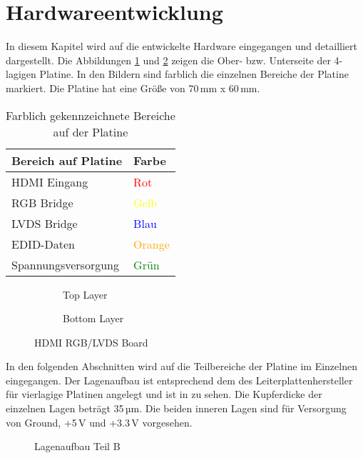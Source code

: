 \section{Hardwareentwicklung}
\label{sec:TeilB_Hardware}
In diesem Kapitel wird auf die entwickelte Hardware eingegangen und detailliert dargestellt. Die Abbildungen \ref{fig:teilb_pcb_top} und \ref{fig:teilb_pcb_bot} zeigen die Ober- bzw. Unterseite der 4-lagigen Platine. In den Bildern sind farblich die einzelnen Bereiche der Platine markiert. Die Platine hat eine Größe von 70\,mm x 60\,mm.

\begin{table}[h]
\begin{tabular}{|p{8cm}|p{5.5cm}|}\hline
\rowcolor{TableBackgroundColor} 
   \textbf{Bereich auf Platine} & \textbf{Farbe}\\ \hline
  HDMI Eingang &  \textcolor{red}{Rot} \\ \hline
  RGB Bridge & \textcolor{yellow}{Gelb} \\ \hline
  LVDS Bridge & \textcolor{blue}{Blau}  \\ \hline
  EDID-Daten &  \textcolor{orange}{Orange} \\ \hline
  Spannungsversorgung &  \textcolor{green}{Grün} \\ \hline 
\end{tabular}
\caption{Farblich gekennzeichnete Bereiche auf der Platine}
\label{tab:pcb_areas}
\end{table}

\begin{figure}[htbp]
        \centering
        \begin{subfigure}[htp]{0.48\textwidth}
                \caption{Top Layer}
                \label{fig:teilb_pcb_top}
        \end{subfigure}
\quad 
        \begin{subfigure}[htp]{0.48\textwidth}
                             				\caption{Bottom Layer}
                \label{fig:teilb_pcb_bot}
        \end{subfigure}
        \caption{HDMI RGB/LVDS Board}
        \label{fig:teilb_pcb}
\end{figure}

In den folgenden Abschnitten wird auf die Teilbereiche der Platine im Einzelnen eingegangen. Der Lagenaufbau ist entsprechend dem des Leiterplattenhersteller für vierlagige Platinen angelegt und ist in  zu sehen. Die Kupferdicke der einzelnen Lagen beträgt 35\,µm. Die beiden inneren Lagen sind für Versorgung von Ground, +5\,V und +3.3\,V vorgesehen.
        \begin{figure}[htp]
        	\center
            \caption{Lagenaufbau Teil B}
            \label{fig:teilb_lagenaufbau}
        \end{figure}

